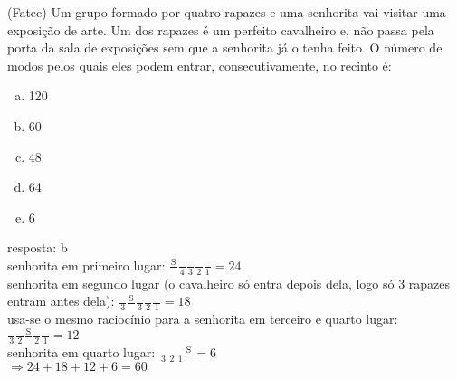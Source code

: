 \begin{ex}
 	(Fatec) Um grupo formado por quatro rapazes e uma senhorita vai visitar uma exposição de arte. Um dos rapazes é um perfeito cavalheiro e, não passa pela porta da sala de exposições sem que a senhorita já o tenha feito. O número de modos pelos quais eles podem entrar, consecutivamente, no recinto é:
    \begin{enumerate}[(a)]
    \item 120
    \item 60
    \item 48
    \item 64
    \item 6
    \end{enumerate}
      \begin{sol}
      resposta: b \\
      senhorita em primeiro lugar:\hspace{0,3cm}
      $\frac{\mathrm{S}}{\phantom{A}}\frac{\phantom{A}}{4}\frac{\phantom{A}}{3}\frac{\phantom{A}}{2}\frac{\phantom{A}}{1}=24$ \\
      senhorita em segundo lugar (o cavalheiro só entra depois dela, logo só 3 rapazes entram antes dela):\hspace{0,3cm}
      $\frac{\phantom{A}}{3}\frac{\mathrm{S}}{\phantom{A}}\frac{\phantom{A}}{3}\frac{\phantom{A}}{2}\frac{\phantom{A}}{1}=18$ \\
      usa-se o mesmo raciocínio para a senhorita em terceiro e quarto lugar:\hspace{0,3cm}
      $\frac{\phantom{A}}{3}\frac{\phantom{A}}{2}\frac{\mathrm{S}}{\phantom{A}}\frac{\phantom{A}}{2}\frac{\phantom{A}}{1}=12$ \\
      senhorita em quarto lugar: \hspace{0,3cm}
      $\frac{\phantom{A}}{3}\frac{\phantom{A}}{2}\frac{\phantom{A}}{1}\frac{\mathrm{S}}{\phantom{A}}=6$ \\
      $\Longrightarrow  24+18+12+6=60$
      
      \end{sol}
    
\end{ex}